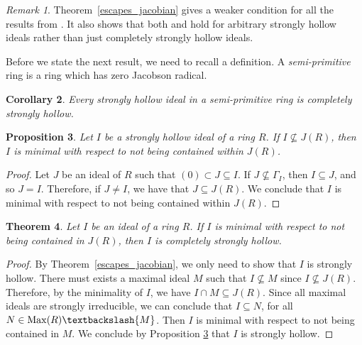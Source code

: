 \documentclass[11pt,english]{amsart}
\newtheorem{theorem}{Theorem}[section]
\newtheorem{proposition}[theorem]{Proposition}
\newtheorem{corollary}[theorem]{Corollary}
\theoremstyle{definition}
\numberwithin{equation}{section}
\theoremstyle{remark}
\newtheorem{remark}[theorem]{Remark}
\begin{document}
\begin{remark}
Theorem~\ref{escapes_jacobian} gives a weaker condition for all the results from \cite[Theoremm.~1.27]{Rostami2021}. It also shows that both \cite[Proposition.~2.14]{Rostami2021} and \cite[Proposition.~2.15]{Rostami2021} hold for arbitrary strongly hollow ideals rather than just completely strongly hollow ideals.
\end{remark}

Before we state the next result, we need to recall a definition. A \emph{semi-primitive} ring is a ring which has zero Jacobson radical.

\begin{corollary}
    Every strongly hollow ideal in a semi-primitive ring is completely strongly hollow. 
\end{corollary}

\begin{proposition}\label{si_min}
    Let $I$ be a strongly hollow ideal of a ring $R$. If $I\not\subseteq J(R)$, then $I$ is minimal with respect to not being contained within $J(R)$.
\end{proposition}

\begin{proof}
    Let $J$ be an ideal of $R$ such that $(0)\subset J\subseteq I$. If $J\not\subseteq \Gamma_I$, then $I\subseteq J$, and so $J=I$. Therefore, if $J\neq I$, we have that $J\subseteq J(R)$. We conclude that $I$ is minimal with respect to not being contained within $J(R)$.
\end{proof}

\begin{theorem}
    Let $I$ be an ideal of a ring $R$. If $I$ is minimal with respect to not being contained in $J(R)$, then $I$ is completely strongly hollow.
\end{theorem}

\begin{proof}
    By Theorem~\ref{escapes_jacobian}, we  only need to show that $I$ is strongly hollow. There must exists a maximal ideal $M$ such that $I\not\subseteq M$ since $I\not\subseteq J(R)$. Therefore, by the minimality of $I$, we have $I\cap M\subseteq J(R)$. Since all maximal ideals are strongly irreducible, we can conclude that $I\subseteq N$, for all $N\in\mathrm{Max}(R)\textbackslash\{M\}$. Then $I$ is minimal with respect to not being contained in $M$. We conclude by Proposition \ref{si_min} that $I$ is strongly hollow. 
\end{proof}
\end{document}
